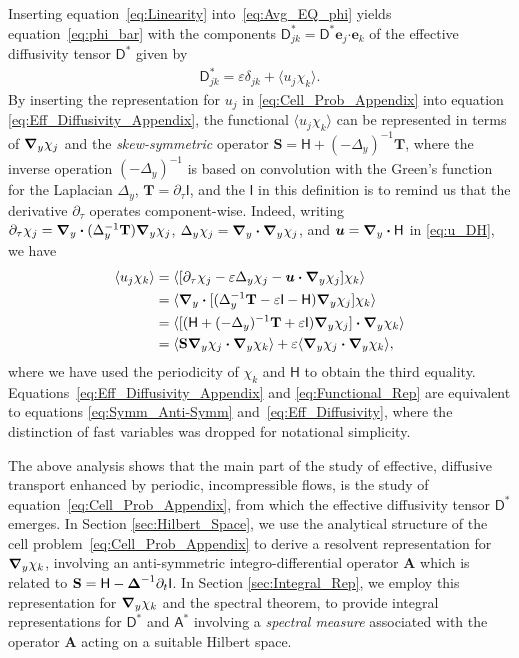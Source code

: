 \documentclass[leqno,onefignum,onetabnum]{siamltex1213}
\newcommand{\Tb}{\mathbf{T}}
\newcommand{\Sb}{\mathbf{S}}
\newcommand{\Ab}{\mathbf{A}}
\newcommand{\Dm}{\mathsf{D}}
\newcommand{\Hm}{\mathsf{H}}
\newcommand{\Am}{\mathsf{A}}
\newcommand{\Ib}{\mathsf{I}}
\newcommand\bDelta{\mbox{\boldmath${\Delta}$}}
\newcommand\bnabla{\mbox{\boldmath${\nabla}$}}
\providecommand\bcdot{\boldsymbol{\cdot}}
\newcommand{\vecu}{\boldsymbol{u}}
\newcommand{\vece}{\boldsymbol{e}}
\begin{document}
Inserting equation~\eqref{eq:Linearity} into~\eqref{eq:Avg_EQ_phi}
yields equation~\eqref{eq:phi_bar} with the components
$\Dm^*_{jk}=\Dm^*\vece _j\bcdot\vece _k$ of the effective diffusivity
tensor $\Dm^*$ given by 
%
\begin{align}\label{eq:Eff_Diffusivity_Appendix}
  \Dm^*_{jk}=\varepsilon\delta_{jk}+\langle u_j\chi_k\rangle.
\end{align}
%
By inserting the representation for $u_j$ in
\eqref{eq:Cell_Prob_Appendix} into equation
\eqref{eq:Eff_Diffusivity_Appendix}, the functional $\langle u_j\chi_k\rangle$ can be
represented in terms of $\bnabla _y\chi_j$ and the \emph{skew-symmetric}
operator $\Sb=\Hm+(-\Delta_y)^{-1}\Tb$, where the inverse operation $(-\Delta_y)^{-1}$
is based on convolution with the Green's function for the Laplacian
$\Delta_y$, $\Tb=\partial_\tau\Ib$, and the $\Ib$ in this definition is to remind us
that the derivative $\partial_\tau$ operates component-wise. Indeed, writing  
$\partial_\tau\chi_j
=\bnabla _y\bcdot(\Delta_y^{-1}\Tb)\bnabla _y\chi_j$,
$\Delta_y\chi_j=\bnabla _y\bcdot\bnabla _y\chi_j$, and $\vecu =\bnabla _y\bcdot\Hm$ in
\eqref{eq:u_DH}, we have    
%
\begin{align}%
  \langle u_j\chi_k\rangle&=\langle[\partial_\tau\chi_j-\varepsilon\Delta_y\chi_j-\vecu \bcdot\bnabla _y\chi_j]\chi_k\rangle
       \\
       &=\langle\bnabla _y\bcdot[(\Delta_y^{-1}\Tb-\varepsilon\Ib-\Hm)\bnabla _y\chi_j]\chi_k\rangle
       \notag\\
       &=\langle[(\Hm+(-\Delta_y)^{-1}\Tb+\varepsilon\Ib)\bnabla _y\chi_j]\bcdot\bnabla _y\chi_k\rangle
       \notag\\
       &=\langle\Sb\bnabla _y\chi_j\bcdot\bnabla _y\chi_k\rangle+\varepsilon\langle\bnabla _y\chi_j\bcdot\bnabla _y\chi_k\rangle,
       \notag
\end{align}
%
where we have used the periodicity of $\chi_k$ and $\Hm$ to obtain the
third equality. Equations~\eqref{eq:Eff_Diffusivity_Appendix} and
\eqref{eq:Functional_Rep} are equivalent to equations
\eqref{eq:Symm_Anti-Symm} and~\eqref{eq:Eff_Diffusivity}, where the
distinction of fast variables was dropped for notational simplicity. 





The above analysis shows that the main part of the study of effective, 
diffusive transport enhanced by periodic, incompressible flows, is the
study of equation~\eqref{eq:Cell_Prob_Appendix}, from which the
effective diffusivity tensor $\Dm^*$ emerges. In Section
\ref{sec:Hilbert_Space}, we use the analytical structure of the cell
problem~\eqref{eq:Cell_Prob_Appendix} to derive a resolvent
representation for $\bnabla _y\chi_k$, involving an anti-symmetric
integro-differential operator $\Ab$ which is related to 
$\Sb=\Hm-\bDelta^{-1}\partial_t\Ib$. In Section \ref{sec:Integral_Rep}, 
we employ this representation for $\bnabla _y\chi_k$ and the spectral
theorem, to provide integral representations for $\Dm^*$ and
$\Am^*$ involving a \emph{spectral measure} associated with the
operator $\Ab$ acting on a suitable Hilbert space.     
   
\end{document}
